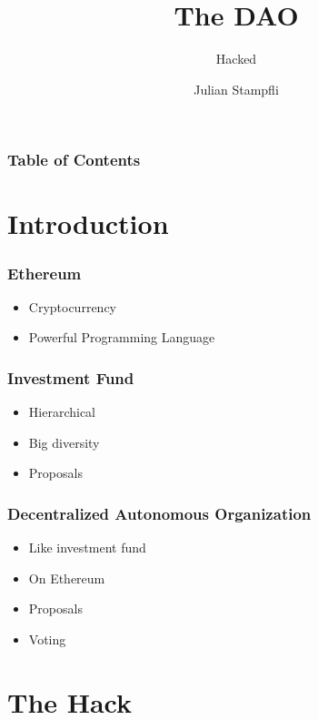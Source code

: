 \documentclass{beamer}
\begin{document}
\title{The DAO}
\subtitle{Hacked}
\author{Julian Stampfli}

\frame{\titlepage}

\begin{frame}
  \frametitle{Table of Contents}
  \tableofcontents
\end{frame}

\section{Introduction}


\begin{frame}[fragile]
  \frametitle{Ethereum}
  \begin{itemize}
    \item Cryptocurrency
    \item Powerful Programming Language
  \end{itemize}
\end{frame}


\begin{frame}[fragile]
  \frametitle{Investment Fund}
  \begin{itemize}
    \item Hierarchical
    \item Big diversity
    \item Proposals
  \end{itemize}
\end{frame}

\begin{frame}[fragile]
  \frametitle{Decentralized Autonomous Organization}
  \begin{itemize}
    \item Like investment fund
    \item On Ethereum
    \item Proposals
    \item Voting
  \end{itemize}
\end{frame}

\section{The Hack}
\end{document}
